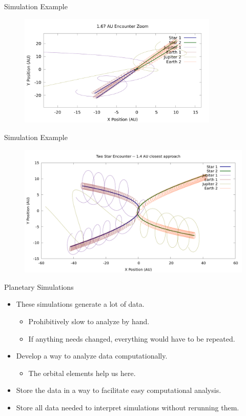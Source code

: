 \documentclass{beamer}
\begin{document}
\begin{frame}{Simulation Example}
    \begin{figure}
        \centering
        \includegraphics[width=3.75in]{1_67_AU_zoom}
    \end{figure}
\end{frame}

\begin{frame}{Simulation Example}
    \begin{figure}
        \centering
        \includegraphics[height=2.5in]{1.4AU/1_4_AU_encounter_plot}
    \end{figure}
\end{frame}

\begin{frame}{Planetary Simulations}
    \begin{itemize}
        \item These simulations generate a lot of data.
            \begin{itemize}
                \item Prohibitively slow to analyze by hand.
                \item If anything needs changed, everything would have to be
                    repeated.
            \end{itemize}
        \item Develop a way to analyze data computationally.
            \begin{itemize}
                \item The orbital elements help us here.
            \end{itemize}
        \item Store the data in a way to facilitate easy computational
            analysis.
        \item Store all data needed to interpret simulations without rerunning them.
    \end{itemize}
\end{frame}
\end{document}
